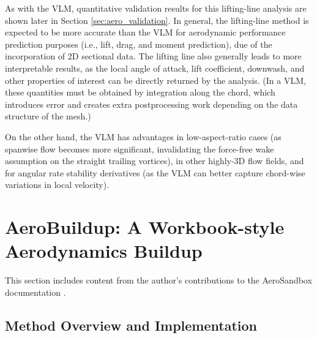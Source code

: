 As with the VLM, quantitative validation results for this lifting-line analysis are shown later in Section \ref{sec:aero_validation}. In general, the lifting-line method is expected to be more accurate than the VLM for aerodynamic performance prediction purposes (i.e., lift, drag, and moment prediction), due of the incorporation of 2D sectional data. The lifting line also generally leads to more interpretable results, as the local angle of attack, lift coefficient, downwash, and other properties of interest can be directly returned by the analysis. (In a VLM, these quantities must be obtained by integration along the chord, which introduces error and creates extra postprocessing work depending on the data structure of the mesh.)

On the other hand, the VLM has advantages in low-aspect-ratio cases (as spanwise flow becomes more significant, invalidating the force-free wake assumption on the straight trailing vortices), in other highly-3D flow fields, and for angular rate stability derivatives (as the VLM can better capture chord-wise variations in local velocity).

\section{AeroBuildup: A Workbook-style Aerodynamics Buildup}
\label{sec:ab}

\begin{attrib}
    This section includes content from the author's contributions to the AeroSandbox documentation \cite{asb_github}.
\end{attrib}

\subsection{Method Overview and Implementation}

